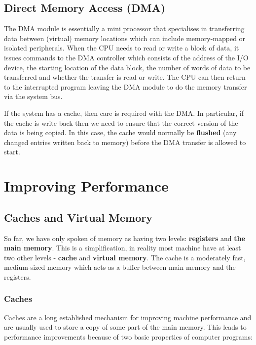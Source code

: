 \documentclass{article}
\begin{document}
	\subsection{Direct Memory Access (DMA)}
	The DMA module is essentially a mini processor that specialises in transferring data between (virtual) memory locations which can include memory-mapped or isolated peripherals. When the CPU needs to read or write a block of data, it issues commands to the DMA controller which consists of the address of the I/O device, the starting location of the data block, the number of words of data to be transferred and whether the transfer is read or write. The CPU can then return to the interrupted program leaving the DMA module to do the memory transfer via the system bus. 
	\par 
	If the system has a cache, then care is required with the DMA. In particular, if the cache is write-back then we need to ensure that the correct version of the data is being copied. In this case, the cache would normally be \textbf{flushed} (any changed entries written back to memory) before the DMA transfer is allowed to start.
		
	
	
	\section{Improving Performance}
	\subsection{Caches and Virtual Memory}
	So far, we have only spoken of memory as having two levels: \textbf{registers} and \textbf{the main memory}. This is a simplification, in reality most machine have at least two other levels - \textbf{cache} and \textbf{virtual memory}. The cache is a moderately fast, medium-sized memory which acts as a buffer between main memory and the registers.
	
	\subsubsection{Caches}
	Caches are a long established mechanism for improving machine performance and are usually used to store a copy of some part of the main memory. This leads to performance improvements because of two basic properties of computer programs:
	
\end{document}

